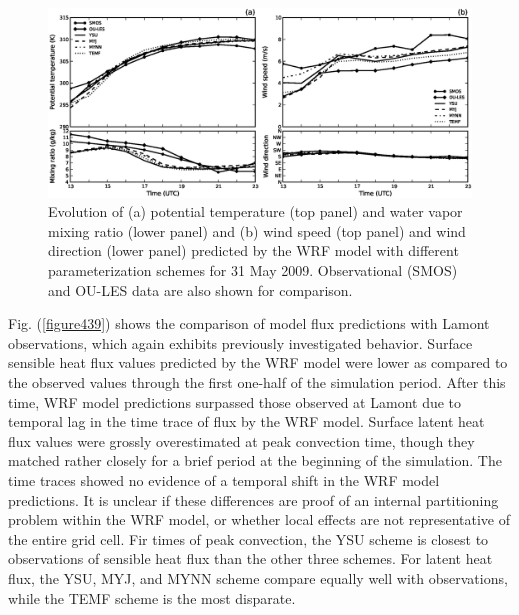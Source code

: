 \begin{figure}[ht!]
\begin{center}
\includegraphics[width=\textwidth]{figures/chapter4/meteogram_phys_20090531}
\end{center}
\caption{Evolution of (a) potential temperature (top panel) and water vapor mixing ratio (lower panel) and (b) wind speed (top panel) and wind direction (lower panel) predicted by the WRF model with different parameterization schemes for 31 May 2009. Observational (SMOS) and OU-LES data are also shown for comparison.}
\label{figure438}
\end{figure}


Fig. (\autoref{figure439}) shows the comparison of model flux predictions with Lamont observations, which again exhibits previously investigated behavior. Surface sensible heat flux values predicted by the WRF model were lower as compared to the observed values through the first one-half of the simulation period. After this time, WRF model predictions surpassed those observed at Lamont due to temporal lag in the time trace of flux by the WRF model. Surface latent heat flux values were grossly overestimated at peak convection time, though they matched rather closely for a brief period at the beginning of the simulation. The time traces showed no evidence of a temporal shift in the WRF model predictions. It is unclear if these differences are proof of an internal partitioning problem within the WRF model, or whether local effects are not representative of the entire grid cell. Fir times of peak convection, the YSU scheme is closest to observations of sensible heat flux than the other three schemes. For latent heat flux, the YSU, MYJ, and MYNN scheme compare equally well with observations, while the TEMF scheme is the most disparate. 


